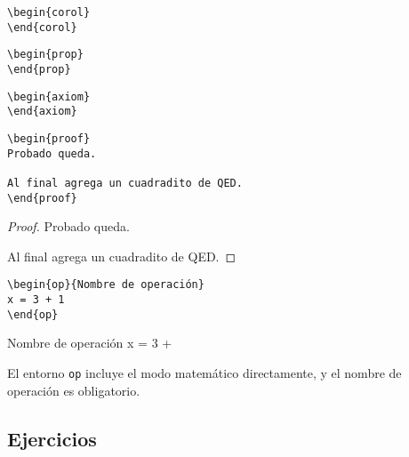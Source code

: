 \documentclass[nochap]{apuntes}
\begin{document}
\begin{verbatim}
\begin{corol}
\end{corol}
\end{verbatim}

\begin{corol}
\end{corol}

\begin{verbatim}
\begin{prop}
\end{prop}
\end{verbatim}

\begin{prop}
\end{prop}

\begin{verbatim}
\begin{axiom}
\end{axiom}
\end{verbatim}

\begin{axiom}
\end{axiom}

\begin{verbatim}
\begin{proof}
Probado queda.

Al final agrega un cuadradito de QED.
\end{proof}
\end{verbatim}

\begin{proof}
Probado queda.

Al final agrega un cuadradito de QED.
\end{proof}

\begin{verbatim}
\begin{op}{Nombre de operación}
x = 3 + 1
\end{op}
\end{verbatim}

\begin{op}{Nombre de operación}
x = 3 + 
\end{op}

El entorno \texttt{op} incluye el modo matemático directamente, y el nombre de operación es obligatorio.

\subsection{Ejercicios}
\end{document}

